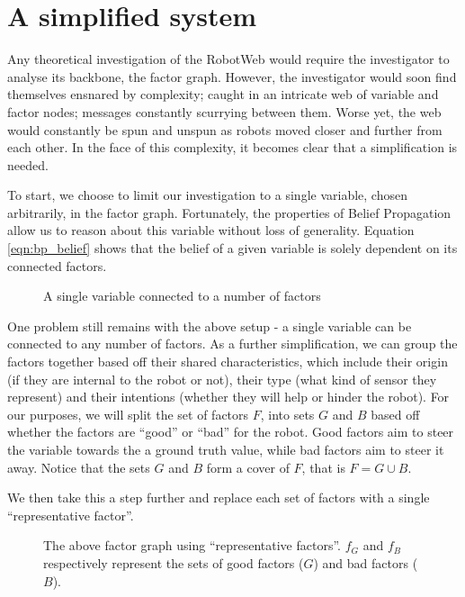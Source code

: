 \section{A simplified system}
Any theoretical investigation of the RobotWeb would require the investigator to analyse its backbone, the factor graph.
However, the investigator would soon find themselves ensnared by complexity; caught in an intricate web of variable and factor nodes; messages constantly scurrying between them.
Worse yet, the web would constantly be spun and unspun as robots moved closer and further from each other.
In the face of this complexity, it becomes clear that a simplification is needed.

To start, we choose to limit our investigation to a single variable, chosen arbitrarily, in the factor graph. 
Fortunately, the properties of Belief Propagation allow us to reason about this variable without loss of generality.
Equation \ref{eqn:bp_belief} shows that the belief of a given variable is solely dependent on its connected factors. 

\begin{figure}[!h]
    \centering
    

    \caption[Single Variable in a Factor Graph]{A single variable connected to a number of factors}
\end{figure}

One problem still remains with the above setup - a single variable can be connected to any number of factors. 
As a further simplification, we can group the factors together based off their shared characteristics, which include their origin (if they are internal to the robot or not), their type (what kind of sensor they represent) and their intentions (whether they will help or hinder the robot).
For our purposes, we will split the set of factors $F$, into sets $G$ and $B$ based off whether the factors are ``good'' or ``bad'' for the robot.
Good factors aim to steer the variable towards the a ground truth value, while bad factors aim to steer it away.
Notice that the sets $G$ and $B$ form a cover of $F$, that is $F = G \cup B$.

We then take this a step further and replace each set of factors with a single ``representative factor''.
\begin{figure}[!ht]
    \centering
    

    \caption[Representative factor graph around a single variable]{The above factor graph using ``representative factors''. $f_G$ and $f_B$ respectively represent the sets of good factors ($G$) and bad factors ($B$).}
\end{figure}

